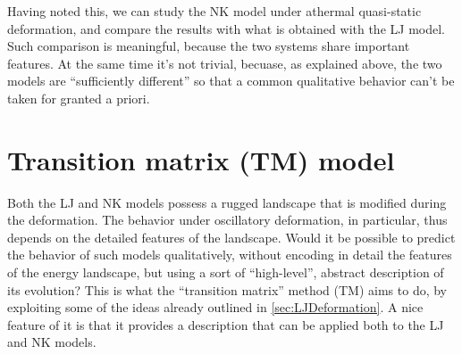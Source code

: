 Having noted this, we can study the NK model under athermal quasi-static deformation, and compare the results with what is obtained with the LJ model. Such comparison is meaningful, because the two systems share important features. At the same time it's not trivial, becuase, as explained above, the two models are ``sufficiently different'' so that a common qualitative behavior can't be taken for granted a priori.

\section{Transition matrix (TM) model \label{sec:TransitionMatrixModel}}

Both the LJ and NK models possess a rugged landscape that is modified during the deformation. The behavior under oscillatory deformation, in particular, thus depends on the detailed features of the landscape.
Would it be possible to predict the behavior of such models qualitatively, without encoding in detail the features of the energy landscape, but using a sort of ``high-level'', abstract description of its evolution? This is what the ``transition matrix'' method (TM) aims to do, by exploiting some of the ideas already outlined in \autoref{sec:LJDeformation}. A nice feature of it is that it provides a description that can be applied both to the LJ and NK models.\\

